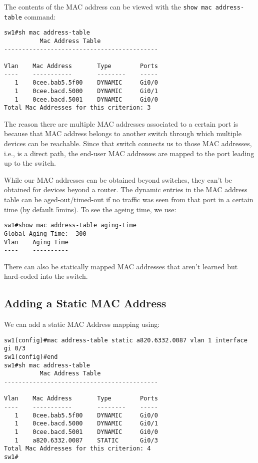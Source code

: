 The contents of the MAC address can be viewed with the \verb|show mac address-table| command: 

\vspace{-15pt}
\begin{verbatim}
sw1#sh mac address-table
          Mac Address Table
-------------------------------------------

Vlan    Mac Address       Type        Ports
----    -----------       --------    -----
   1    0cee.bab5.5f00    DYNAMIC     Gi0/0
   1    0cee.bacd.5000    DYNAMIC     Gi0/1
   1    0cee.bacd.5001    DYNAMIC     Gi0/0
Total Mac Addresses for this criterion: 3
\end{verbatim}
\vspace{-10pt}

\noindent
The reason there are multiple MAC addresses associated to a certain port is because that MAC address belongs to another switch through which multiple devices can be reachable. Since that switch connects us to those MAC addresses, i.e., is a direct path, the end-user MAC addresses are mapped to the port leading up to the switch. 

While our MAC addresses can be obtained beyond switches, they can't be obtained for devices beyond a router. The dynamic entries in the MAC address table can be aged-out/timed-out if no traffic was seen from that port in a certain time (by default 5mins). To see the ageing time, we use: 

\vspace{-15pt}
\begin{verbatim}
sw1#show mac address-table aging-time
Global Aging Time:  300
Vlan    Aging Time
----    ----------
\end{verbatim}
\vspace{-10pt}

\noindent
There can also be statically mapped MAC addresses that aren't learned but hard-coded into the switch. 

\subsection{Adding a Static MAC Address}
We can add a static MAC Address mapping using: 

\vspace{-15pt}
\begin{verbatim}
sw1(config)#mac address-table static a820.6332.0087 vlan 1 interface gi 0/3
sw1(config)#end
sw1#sh mac address-table
          Mac Address Table
-------------------------------------------

Vlan    Mac Address       Type        Ports
----    -----------       --------    -----
   1    0cee.bab5.5f00    DYNAMIC     Gi0/0
   1    0cee.bacd.5000    DYNAMIC     Gi0/1
   1    0cee.bacd.5001    DYNAMIC     Gi0/0
   1    a820.6332.0087    STATIC      Gi0/3
Total Mac Addresses for this criterion: 4
sw1#
\end{verbatim}
\vspace{-10pt}

